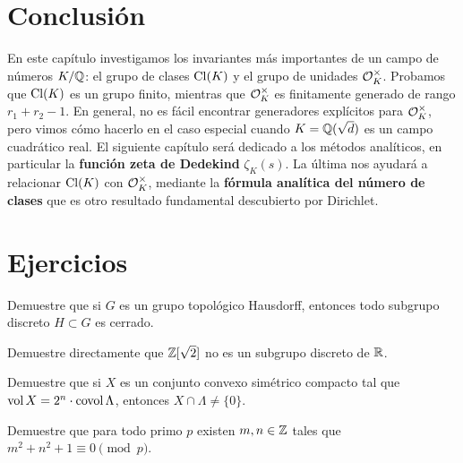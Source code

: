 

\section*{Conclusión}

En este capítulo investigamos los invariantes más importantes de un campo de
números $K/\mathbb{Q}$: el grupo de clases $\operatorname{Cl} (K)$ y el grupo de unidades
$\mathcal{O}_K^\times$. Probamos que $\operatorname{Cl} (K)$ es un grupo finito, mientras que
$\mathcal{O}_K^\times$ es finitamente generado de rango $r_1 + r_2 - 1$. En general,
no es fácil encontrar generadores explícitos para $\mathcal{O}_K^\times$, pero vimos cómo
hacerlo en el caso especial cuando $K = \mathbb{Q} (\sqrt{d})$ es un campo cuadrático
real. El siguiente capítulo será dedicado a los métodos analíticos,
en particular la \textbf{función zeta de Dedekind} $\zeta_K (s)$. La última
nos ayudará a relacionar $\operatorname{Cl} (K)$ con $\mathcal{O}_K^\times$, mediante la
\textbf{fórmula analítica del número de clases} que es otro resultado
fundamental descubierto por Dirichlet.


\pagebreak


\section*{Ejercicios}

\begin{ejercicio}
  Demuestre que si $G$ es un grupo topológico Hausdorff, entonces todo subgrupo
  discreto $H \subset G$ es cerrado.
\end{ejercicio}

\begin{ejercicio}
  Demuestre directamente que $\mathbb{Z} [\sqrt{2}]$ no es un subgrupo discreto de
  $\mathbb{R}$.
\end{ejercicio}

\begin{ejercicio}
  Demuestre que si $X$ es un conjunto convexo simétrico compacto tal que
  $\operatorname{vol} X = 2^n\cdot \operatorname{covol} \Lambda$, entonces $X \cap \Lambda \ne \{ 0 \}$.
\end{ejercicio}

\begin{ejercicio}
  Demuestre que para todo primo $p$ existen $m,n \in \mathbb{Z}$ tales que
  $m^2 + n^2 + 1 \equiv 0 \pmod{p}$.
\end{ejercicio}

